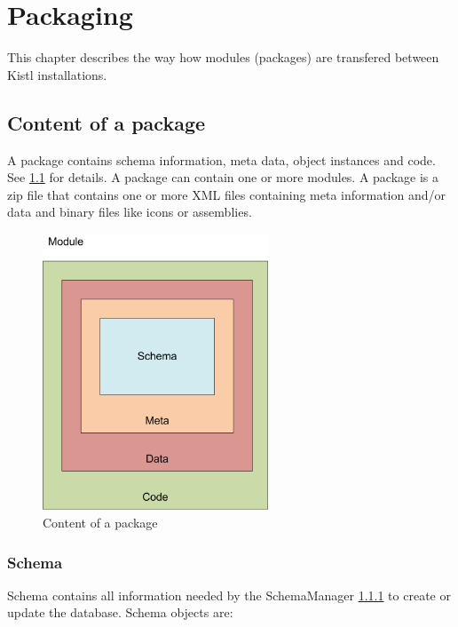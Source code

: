 \chapter{\label{Packaging}Packaging}
This chapter describes the way how modules (packages) are transfered between Kistl installations.

\section{\label{Packaging_Content_of_a_package}Content of a package}

A package contains schema information, meta data, object instances and code. See \ref{content_of_package} for details. 
A package can contain one or more modules. A package is a zip file that contains one or more XML files containing meta information and/or data and binary files like icons or assemblies.

\begin{figure}[ht]
	\begin{center}
		\includegraphics[width=0.6\textwidth]{images/content_of_package.png}
		\caption{Content of a package}
		\label{content_of_package}
	\end{center}
\end{figure}

\subsection{\label{Packaging_Schema}Schema}

Schema contains all information needed by the SchemaManager \ref{} to create or update the database. Schema objects are:

